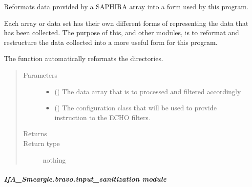 \documentclass[letterpaper,10pt,english]{sphinxmanual}
\begin{document}
\begin{fulllineitems}
\label{\detokenize{python_docstrings/IfA_Smeargle.bravo.bravo_main:IfA_Smeargle.bravo.bravo_main.bravo_execution_saphira}}
Reformats data provided by a SAPHIRA array into a form used by this
program.

Each array or data set has their own different forms of representing the
data that has been collected. The purpose of this, and other modules, is
to reformat and restructure the data collected into a more useful form
for this program.

The function automatically reformats the directories.
\begin{quote}\begin{description}
\item[{Parameters}] \leavevmode\begin{itemize}
\item {} 
 () \textendash{} The data array that is to processed and filtered accordingly

\item {} 
 ({\hyperref[\detokenize{python_docstrings/IfA_Smeargle.yankee.yankee_main:IfA_Smeargle.yankee.yankee_main.SmeargleConfig}]{}}) \textendash{} The configuration class that will be used to provide instruction
to the ECHO filters.

\end{itemize}

\item[{Returns}] \leavevmode


\item[{Return type}] \leavevmode
nothing

\end{description}\end{quote}

\end{fulllineitems}



\subparagraph{IfA\_Smeargle.bravo.input\_sanitization module}
\label{\detokenize{python_docstrings/IfA_Smeargle.bravo.input_sanitization:module-IfA_Smeargle.bravo.input_sanitization}}\label{\detokenize{python_docstrings/IfA_Smeargle.bravo.input_sanitization:ifa-smeargle-bravo-input-sanitization-module}}\label{\detokenize{python_docstrings/IfA_Smeargle.bravo.input_sanitization::doc}}
\end{document}
